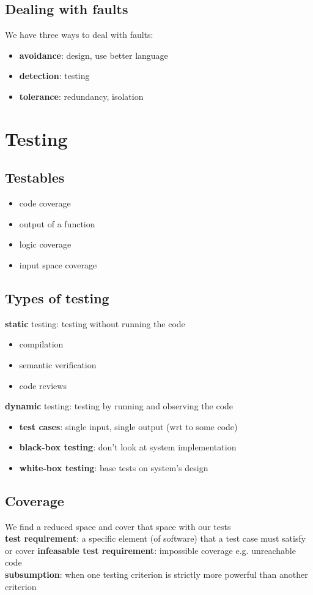 \documentclass[]{article}
\theoremstyle{definition}
\begin{document}
		\subsection{Dealing with faults}
			We have three ways to deal with faults:
			\begin{itemize}
				\item \textbf{avoidance}: design, use better language
				\item \textbf{detection}: testing
				\item \textbf{tolerance}: redundancy, isolation
			\end{itemize}								
	\section{Testing}
		\subsection{Testables}
			\begin{itemize}
				\item code coverage
				\item output of a function
				\item logic coverage
				\item input space coverage
			\end{itemize}
		\subsection{Types of testing}
			\textbf{static} testing: testing without running the code
			\begin{itemize}
				\item compilation
				\item semantic verification
				\item code reviews
			\end{itemize}
			\textbf{dynamic} testing: testing by running and observing the code
			\begin{itemize}
				\item \textbf{test cases}: single input, single output (wrt to some code)
				\item \textbf{black-box testing}: don't look at system implementation
				\item \textbf{white-box testing}: base tests on system's design
			\end{itemize}
		\subsection{Coverage}
			We find a reduced space and cover that space with our tests\\
			\textbf{test requirement}: a specific element (of software) that a test case must satisfy or cover
			\textbf{infeasable test requirement}: impossible coverage e.g. unreachable code \\
			\textbf{subsumption}: when one testing criterion is strictly more powerful than another criterion
\end{document}
